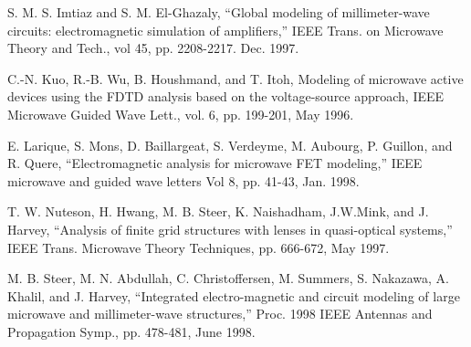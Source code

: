 
\begin{thebibliography}{99}
 S. M. S. Imtiaz and S. M. El-Ghazaly, ``Global
modeling of millimeter-wave circuits: electromagnetic simulation of
amplifiers,'' IEEE Trans. on Microwave Theory and Tech., vol 45,
pp. 2208-2217.  Dec. 1997.

 C.-N. Kuo, R.-B. Wu, B. Houshmand, and T. Itoh, Modeling
of microwave active devices using the FDTD analysis based on the
voltage-source approach, IEEE Microwave Guided Wave Lett., vol. 6,
pp. 199-201, May 1996.

 E. Larique, S. Mons, D. Baillargeat, S. Verdeyme,
M. Aubourg, P.  Guillon, and R. Quere, ``Electromagnetic analysis for
microwave FET modeling,'' IEEE microwave and guided wave letters Vol
8, pp. 41-43, Jan. 1998.

 T. W. Nuteson, H. Hwang, M. B. Steer, K. Naishadham,
J.W.Mink, and J. Harvey, ``Analysis of finite grid structures with
lenses in quasi-optical systems,'' IEEE Trans. Microwave Theory
Techniques, pp. 666-672, May 1997.

 M. B. Steer, M. N. Abdullah, C. Christoffersen,
M. Summers, S. Nakazawa, A. Khalil, and J. Harvey, ``Integrated
electro-magnetic and circuit modeling of large microwave and
millimeter-wave structures,'' Proc. 1998 IEEE Antennas and Propagation
Symp., pp. 478-481, June 1998.


\end{thebibliography}
